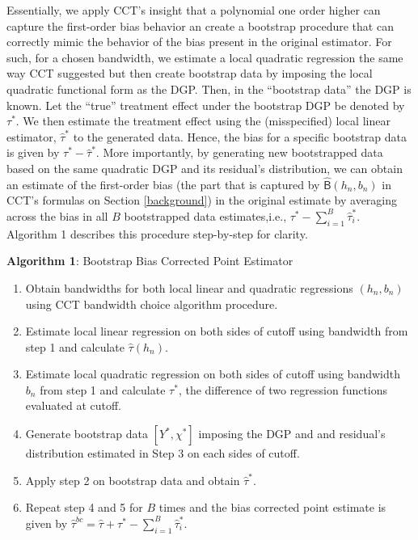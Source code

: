 \documentclass[12pt,fleqn]{article}
\begin{document}
Essentially, we apply CCT's insight that a polynomial one order higher can capture the first-order bias behavior an create a bootstrap procedure that can correctly mimic the behavior of the bias present in the original estimator. For such, for a chosen bandwidth, we estimate a local quadratic regression the same way CCT suggested but then create bootstrap data by imposing the local quadratic functional form as the DGP. Then, in the ``bootstrap data'' the DGP is known. Let the ``true'' treatment effect under the bootstrap DGP be denoted by $\tau^{*}$. We then estimate the treatment effect using the (misspecified) local linear estimator, $\hat{\tau}^{*}$ to the generated data. Hence, the bias for a specific bootstrap data is given by $\tau^{*}-\hat{\tau}^{*}$. More importantly, by generating new bootstrapped data based on the same quadratic DGP and its residual's distribution, we can obtain an estimate of the first-order bias (the part that is captured by $\hat{\mathsf{B}}(h_{n},b_{n})$ in CCT's formulas on Section \ref{background}) in the original estimate by averaging across the bias in all $B$ bootstrapped data estimates,i.e., $\tau^{*} - \sum_{i = 1}^{B} \hat{\tau}_{ i}^{*}$. Algorithm 1 describes this procedure step-by-step for clarity.

\textbf{Algorithm 1}: Bootstrap Bias Corrected Point Estimator
 \begin{enumerate}
	\item Obtain bandwidths for both local linear and quadratic regressions $(h_{n}, b_{n})$ using CCT bandwidth choice algorithm procedure.
	\item Estimate local linear regression on both sides of cutoff using bandwidth from step 1 and calculate $\hat{\tau}(h_{n})$.
	\item Estimate local quadratic regression on both sides of cutoff using bandwidth $b_{n}$ from step 1 and calculate $\tau^{*}$, the difference of two regression functions evaluated at cutoff.
	\item Generate bootstrap data $[Y^{*},\chi^{*}]$ imposing the DGP and and residual's distribution estimated in Step 3 on each sides of cutoff.
	\item Apply step 2 on bootstrap data and obtain $\hat{\tau}^{*}$.
	\item Repeat step 4 and 5 for $B$ times and the bias corrected point estimate is given by $\hat{\tau}^{bc}=\hat{\tau} + \tau^{*} - \sum_{i = 1}^{B} \hat{\tau}_{ i}^{*}$.
 \end{enumerate}
\end{document}
